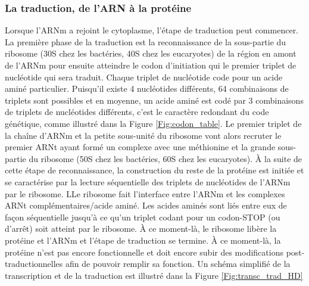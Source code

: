 \subsubsection{La traduction, de l'ARN à la protéine}



Lorsque l'ARNm a rejoint le cytoplasme, l'étape de traduction peut commencer. La première phase de la traduction est la reconnaissance de la sous-partie du ribosome (30S chez les bactéries, 40S chez les eucaryotes) de la région en amont de l'ARNm pour ensuite atteindre le codon d'initiation qui le premier triplet de nucléotide qui sera traduit. Chaque triplet de nucléotide code pour un acide aminé particulier. Puisqu'il existe 4 nucléotides différents, 64 combinaisons de triplets sont possibles et en moyenne, un acide aminé est codé par 3 combinaisons de triplets de nucléotides différents, c'est le caractère redondant du code génétique, comme illustré dans la Figure \ref{Fig:codon_table}. 
Le premier triplet de la chaîne d'ARNm et la petite sous-unité du ribosome vont alors recruter le premier ARNt ayant formé un complexe avec une méthionine et la grande sous-partie du ribosome (50S chez les bactéries, 60S chez les eucaryotes). À la suite de cette étape de reconnaissance, la construction du reste de la protéine est initiée et se caractérise par la lecture séquentielle des triplets de nucléotides de l'ARNm par le ribosome. LLe ribosome fait l'interface entre l'ARNm et les complexes ARNt complémentaires/acide aminé. Les acides aminés sont liés entre eux de façon séquentielle jusqu'à ce qu'un triplet codant pour un codon-STOP (ou d'arrêt) soit atteint par le ribosome. À ce moment-là, le ribosome libère la protéine et l'ARNm et l'étape de traduction se termine. À ce moment-là, la protéine n'est pas encore fonctionnelle et doit encore subir des modifications post-traductionnelles afin de pouvoir remplir sa fonction. Un schéma simplifié de la transcription et de la traduction est illustré dans la Figure \ref{Fig:transc_trad_HD}

